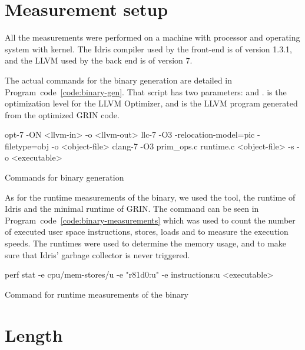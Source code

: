 \documentclass[main.tex]{subfiles}
\begin{document}
	\section{Measurement setup}
	
	All the measurements were performed on a machine with  processor and  operating system with  kernel. The Idris compiler used by the front-end is of version 1.3.1, and the LLVM used by the back end is of version 7.
	
	The actual commands for the binary generation are detailed in Program~code~\ref{code:binary-gen}. That script has two parameters:  and .  is the optimization level for the LLVM Optimizer, and  is the LLVM program generated from the optimized GRIN code.
	
	\begin{codeFloat}[h]
		\begin{bash}
			opt-7 -ON <llvm-in> -o <llvm-out> 
			llc-7 -O3 -relocation-model=pic -filetype=obj -o <object-file>
			clang-7 -O3 prim_ops.c runtime.c <object-file> -s -o <executable>
		\end{bash}
		\caption{Commands for binary generation}
		\label{code:binary-gen}
	\end{codeFloat}
	
	As for the runtime measurements of the binary, we used the  tool, the runtime of Idris and the minimal runtime of GRIN. The  command can be seen in Program~code~\ref{code:binary-measurements} which was used to count the number of executed user space instructions, stores, loads and to measure the execution speeds. The runtimes were used to determine the memory usage, and to make sure that Idris' garbage collector is never triggered.

	\begin{codeFloat}[h]
		\begin{bash}
			perf stat -e cpu/mem-stores/u -e "r81d0:u" -e instructions:u <executable>
		\end{bash}
		\caption{Command for runtime measurements of the binary}
		\label{code:binary-measurements}
	\end{codeFloat}
	
	
	\section{Length}
	
\end{document}
